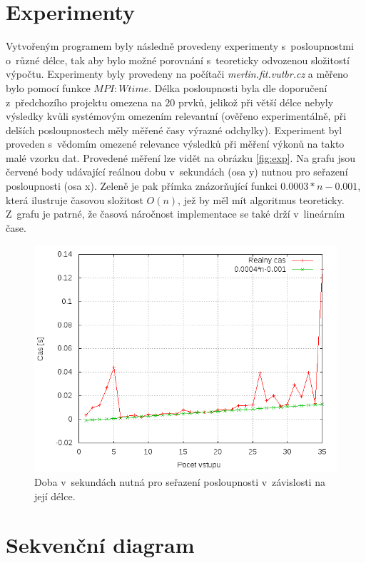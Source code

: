 \documentclass[a4paper, 12pt]{article}
\begin{document}
\section{Experimenty}
\label{sec:exprmts}
Vytvořeným programem byly následně provedeny experimenty s~posloupnostmi o~různé délce, tak aby bylo
možné porovnání s~teoreticky odvozenou složitostí výpočtu.
Experimenty byly provedeny na počítači \emph{merlin.fit.vutbr.cz} a měřeno bylo pomocí
funkce $MPI:Wtime$.
Délka posloupnosti byla dle doporučení z~předchozího projektu omezena na $20$ prvků, jelikož při
větší délce nebyly výsledky kvůli systémovým omezením relevantní (ověřeno experimentálně, při delších
posloupnostech měly měřené časy výrazné odchylky).
Experiment byl proveden s~vědomím omezené relevance výsledků při měření výkonů na takto malé vzorku dat.
Provedené měření lze vidět na obrázku \ref{fig:exp}.
Na grafu jsou červené body udávající reálnou dobu v~sekundách (osa y) nutnou pro seřazení
posloupnosti (osa x).
Zeleně je pak přímka znázorňující funkci $0.0003*n-0.001$, která ilustruje
časovou složitost $O(n)$, jež by měl mít algoritmus teoreticky.
Z~grafu je patrné, že časová náročnost implementace se také drží v~lineárním čase.

\begin{figure}
\includegraphics[width=15cm,keepaspectratio]{plots/perf.png}
\caption{Doba v~sekundách nutná pro seřazení posloupnosti v~závislosti na její délce.}
\end{figure}
\label{fig:exp}


\section{Sekvenční diagram}
\label{sec:seq}

\newpage


\end{document}
